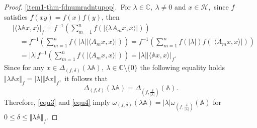 \documentclass[12pt]{article}
\begin{document}
\begin{proof}
\noindent \ref{item1-thm-fdnumradntupop}.\ For $ \lambda\in \mathbb{C}, \ \lambda\neq 0 $ and $ x\in \mathcal{H}, $ since $ f $ satisfies $ f(xy)=f(x)f(y) $, then
\begin{align}
& \vert \langle \lambda \mathbb{A}x,x \rangle\vert_{f}  =  f^{-1}  \left( \sum\limits_{m=1}^{n}f\left( \vert \langle\lambda A_{m}x,x\rangle \vert \right)  \right) \nonumber \\
& \quad =  f^{-1}  \left( \sum\limits_{m=1}^{n}f\left( \vert \lambda \vert\vert \langle A_{m}x,x\rangle \vert \right)  \right)
  =  f^{-1}  \left( \sum\limits_{m=1}^{n}f\left( \vert \lambda \vert\right)f\left(  \vert \langle A_{m}x,x\rangle \vert \right)  \right) \nonumber\\
& \quad =  \vert \lambda \vert f^{-1}  \left( \sum\limits_{m=1}^{n}f\left( \vert \langle A_{m}x,x\rangle \vert \right)  \right)
  =  \vert \lambda \vert \vert \langle \mathbb{A}x,x \rangle\vert_{f}. \label{equ3}
\end{align}
Since for any $ x\in \Delta_{(f,\delta )}(\lambda \mathbb{A} ), \ \lambda \in \mathbb{C}\setminus \lbrace 0 \rbrace  $ the following equality holds
\(
\Vert \lambda  \mathbb{A}x  \Vert_{f} = \vert \lambda \vert \Vert \mathbb{A}x \Vert_{f},
\)
it follows that
\begin{equation}
\label{equ4}
\Delta_{(f,\delta)}(\lambda \mathbb{A})=\Delta_{\left(f, \frac{\delta}{\vert \lambda \vert}\right) } ( \mathbb{A} ).
\end{equation}
Therefore, \eqref{equ3} and \eqref{equ4} imply
\(
\omega_{(f,\delta)}(\lambda \mathbb{A} )= \vert \lambda \vert \omega_{\left(f, \frac{\delta}{\vert \lambda \vert}\right) } ( \mathbb{A} )
\)
for $ 0\leq \delta \leq \Vert \lambda \mathbb{A} \Vert_{f}. $


\end{proof}
\end{document}
